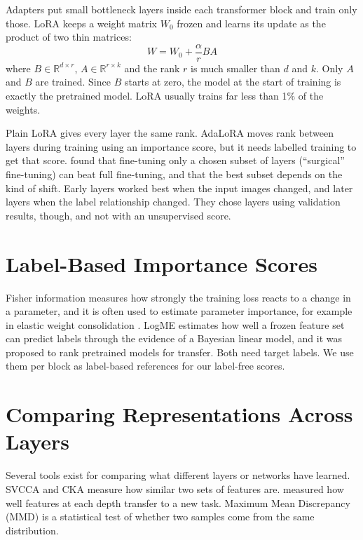 \documentclass[11pt,a4paper]{report}
\begin{document}
Adapters \cite{houlsby2019parameter} put small bottleneck layers inside each transformer block and train only those. LoRA \cite{hu2022lora} keeps a weight matrix $W_0$ frozen and learns its update as the product of two thin matrices:
\begin{equation}
    W = W_0 + \frac{\alpha}{r} B A
\end{equation}
where $B \in \mathbb{R}^{d \times r}$, $A \in \mathbb{R}^{r \times k}$ and the rank $r$ is much smaller than $d$ and $k$. Only $A$ and $B$ are trained. Since $B$ starts at zero, the model at the start of training is exactly the pretrained model. LoRA usually trains far less than 1\% of the weights.

Plain LoRA gives every layer the same rank. AdaLoRA \cite{zhang2023adalora} moves rank between layers during training using an importance score, but it needs labelled training to get that score. \citet{lee2023surgical} found that fine-tuning only a chosen subset of layers (``surgical'' fine-tuning) can beat full fine-tuning, and that the best subset depends on the kind of shift. Early layers worked best when the input images changed, and later layers when the label relationship changed. They chose layers using validation results, though, and not with an unsupervised score.

\section{Label-Based Importance Scores}

Fisher information measures how strongly the training loss reacts to a change in a parameter, and it is often used to estimate parameter importance, for example in elastic weight consolidation \cite{kirkpatrick2017overcoming}. LogME \cite{you2021logme} estimates how well a frozen feature set can predict labels through the evidence of a Bayesian linear model, and it was proposed to rank pretrained models for transfer. Both need target labels. We use them per block as label-based references for our label-free scores.

\section{Comparing Representations Across Layers}

Several tools exist for comparing what different layers or networks have learned. SVCCA \cite{raghu2017svcca} and CKA \cite{kornblith2019similarity} measure how similar two sets of features are. \citet{yosinski2014transferable} measured how well features at each depth transfer to a new task. Maximum Mean Discrepancy (MMD) \cite{gretton2012kernel} is a statistical test of whether two samples come from the same distribution.
\end{document}
